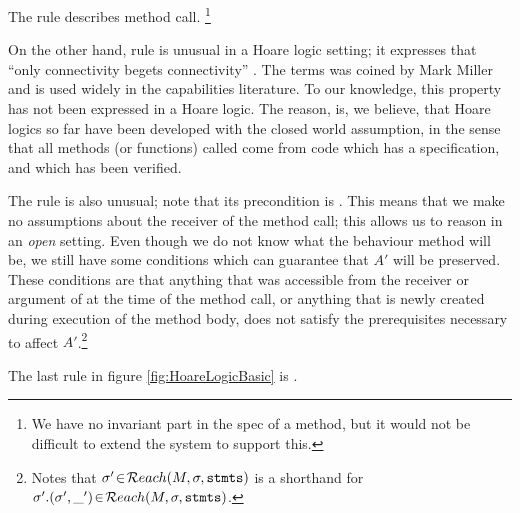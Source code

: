  The   rule     describes method call.  \footnote{We have no invariant part in the spec of a method,  but it would not be difficult to extend the system to support this.}



 On the other hand, rule    is unusual in a Hoare logic setting; it expresses that  ``only connectivity
begets connectivity'' . The terms was coined by Mark Miller  and is used widely in the capabilities literature. To our knowledge, this property has not been expressed in a Hoare logic. The reason, is, we believe, that Hoare logics so far have been developed with the closed world assumption, in the sense that all methods (or functions) called come from code which has a specification, and which has been verified.  


\HoareFigTwo

The rule   is also unusual; note that its precondition is . This means that we make no assumptions about the receiver of the method call; this allows us to reason in an {\em open} setting.  Even though we do not know what the behaviour method  will be, we still have some conditions which can guarantee  that $A'$ will be preserved. These conditions are that anything that was accessible from the receiver  or argument of  at the time of the method call, or anything that is newly created during execution of the method body,  does not satisfy the prerequisites necessary to affect $A'$.\footnote{Notes that  $\sigma'\!\in\!{\mathcal{R}each}(M,\sigma,{{\textrm{\ttfamily{stmts}}}})$ is a shorthand for $\sigma'.  (\sigma',\_')\!\in\!{\mathcal{R}each}(M,\sigma,{{\textrm{\ttfamily{stmts}}}})$. }

 The last rule in figure \ref{fig:HoareLogicBasic} is  . 

